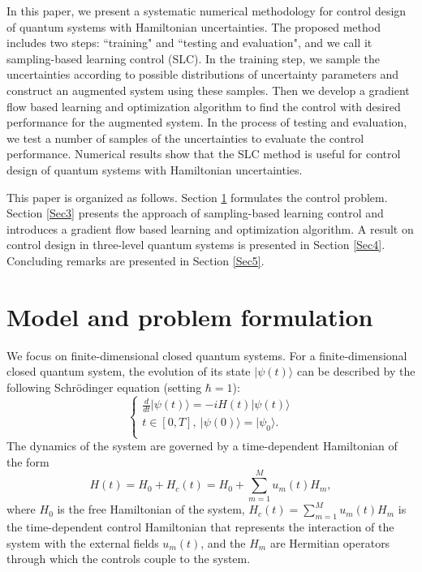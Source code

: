 \documentclass[letterpaper, 10 pt, conference]{ieeeconf}
\begin{document}
In this paper, we present a systematic numerical methodology for control
design of quantum systems with Hamiltonian uncertainties.
The proposed method includes two steps: ``training" and ``testing
and evaluation", and we call it sampling-based learning control
(SLC). In the training step, we sample the uncertainties according to
possible distributions of uncertainty parameters and construct an
augmented system using these samples. Then we develop a gradient
flow based learning and optimization algorithm to find the control
with desired performance for the augmented system. In the
process of testing and evaluation, we test a number of
samples of the uncertainties to evaluate the control performance. Numerical
results show that the SLC method is useful for
control design of quantum systems with Hamiltonian uncertainties.

This paper is organized as follows. Section \ref{Sec2} formulates
the control problem. Section \ref{Sec3}  presents the
approach of sampling-based learning control and introduces  a gradient
flow based learning and optimization algorithm. A result on
control design in three-level quantum systems is
presented in Section \ref{Sec4}. Concluding remarks are
presented in Section \ref{Sec5}.

\section{Model and problem formulation}\label{Sec2}
We focus on finite-dimensional closed quantum systems. For a finite-dimensional closed quantum system, the
evolution of its state $|\psi(t)\rangle$ can be described by the
following Schr\"{o}dinger equation (setting $\hbar=1$):
\begin{equation} \label{systemmodel}
\left\{ \begin{array}{l}
  \frac{d}{dt}|{\psi}(t)\rangle=-iH(t)|\psi(t)\rangle \\
 t\in [0, T], \ |\psi(0)\rangle=|\psi_{0}\rangle.\\
\end{array}
\right.
\end{equation}
The dynamics of the system are governed by a
time-dependent Hamiltonian of the form
\begin{equation}\label{Hamiltonian}
H(t)=H_{0}+H_{c}(t)=H_{0}+\sum_{m=1}^{M}u_{m}(t)H_{m},
\end{equation}
where $H_{0}$ is the free Hamiltonian of the system,
$H_{c}(t)=\sum_{m=1}^{M}u_{m}(t)H_{m}$ is the time-dependent control
Hamiltonian that represents the interaction of the system with the
external fields $u_{m}(t)$, and the $H_{m}$ are Hermitian operators through which the
controls couple to the system.
\end{document}
